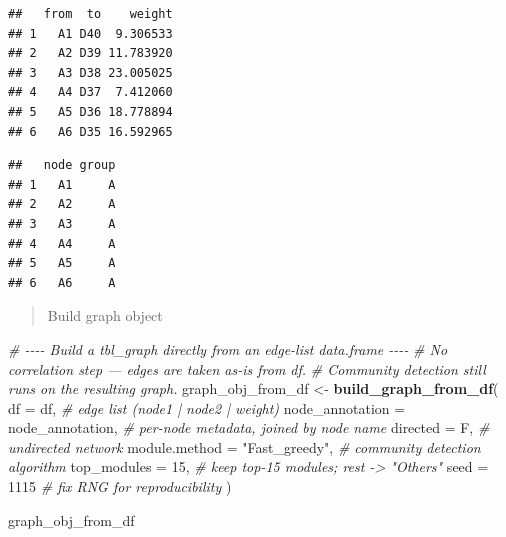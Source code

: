 \documentclass[
]{book}
\newenvironment{Shaded}{\begin{snugshade}}{\end{snugshade}}
\newcommand{\AttributeTok}[1]{\textcolor[rgb]{0.13,0.29,0.53}{#1}}
\newcommand{\CommentTok}[1]{\textcolor[rgb]{0.56,0.35,0.01}{\textit{#1}}}
\newcommand{\DecValTok}[1]{\textcolor[rgb]{0.00,0.00,0.81}{#1}}
\newcommand{\FunctionTok}[1]{\textcolor[rgb]{0.13,0.29,0.53}{\textbf{#1}}}
\newcommand{\NormalTok}[1]{#1}
\newcommand{\OtherTok}[1]{\textcolor[rgb]{0.56,0.35,0.01}{#1}}
\newcommand{\SpecialCharTok}[1]{\textcolor[rgb]{0.81,0.36,0.00}{\textbf{#1}}}
\newcommand{\StringTok}[1]{\textcolor[rgb]{0.31,0.60,0.02}{#1}}
\begin{document}
\begin{verbatim}
##   from  to    weight
## 1   A1 D40  9.306533
## 2   A2 D39 11.783920
## 3   A3 D38 23.005025
## 4   A4 D37  7.412060
## 5   A5 D36 18.778894
## 6   A6 D35 16.592965
\end{verbatim}

\begin{Shaded}
\end{Shaded}

\begin{verbatim}
##   node group
## 1   A1     A
## 2   A2     A
## 3   A3     A
## 4   A4     A
## 5   A5     A
## 6   A6     A
\end{verbatim}

\begin{quote}
Build graph object
\end{quote}

\begin{Shaded}
\begin{Highlighting}[]
\CommentTok{\# {-}{-}{-}{-} Build a tbl\_graph directly from an edge{-}list data.frame {-}{-}{-}{-}}
\CommentTok{\# No correlation step — edges are taken as{-}is from \textasciigrave{}df\textasciigrave{}.}
\CommentTok{\# Community detection still runs on the resulting graph.}
\NormalTok{graph\_obj\_from\_df }\OtherTok{\textless{}{-}} \FunctionTok{build\_graph\_from\_df}\NormalTok{(}
  \AttributeTok{df              =}\NormalTok{ df,                }\CommentTok{\# edge list (node1 | node2 | weight)}
  \AttributeTok{node\_annotation =}\NormalTok{ node\_annotation,   }\CommentTok{\# per{-}node metadata, joined by node name}
  \AttributeTok{directed        =}\NormalTok{ F,                 }\CommentTok{\# undirected network}
  \AttributeTok{module.method   =} \StringTok{"Fast\_greedy"}\NormalTok{,     }\CommentTok{\# community detection algorithm}
  \AttributeTok{top\_modules     =} \DecValTok{15}\NormalTok{,                }\CommentTok{\# keep top{-}15 modules; rest {-}\textgreater{} "Others"}
  \AttributeTok{seed            =} \DecValTok{1115}               \CommentTok{\# fix RNG for reproducibility}
\NormalTok{)}

\NormalTok{graph\_obj\_from\_df}
\end{Highlighting}
\end{Shaded}
\end{document}
